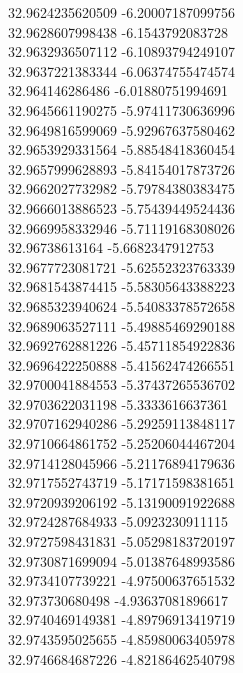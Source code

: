 {32.9624235620509	-6.20007187099756\\
32.9628607998438	-6.1543792083728\\
32.9632936507112	-6.10893794249107\\
32.9637221383344	-6.06374755474574\\
32.964146286486	-6.01880751994691\\
32.9645661190275	-5.97411730636996\\
32.9649816599069	-5.92967637580462\\
32.9653929331564	-5.88548418360454\\
32.9657999628893	-5.84154017873726\\
32.9662027732982	-5.79784380383475\\
32.9666013886523	-5.75439449524436\\
32.9669958332946	-5.71119168308026\\
32.96738613164	-5.6682347912753\\
32.9677723081721	-5.62552323763339\\
32.9681543874415	-5.58305643388223\\
32.9685323940624	-5.54083378572658\\
32.9689063527111	-5.49885469290188\\
32.9692762881226	-5.45711854922836\\
32.9696422250888	-5.41562474266551\\
32.9700041884553	-5.37437265536702\\
32.9703622031198	-5.3333616637361\\
32.9707162940286	-5.29259113848117\\
32.9710664861752	-5.25206044467204\\
32.9714128045966	-5.21176894179636\\
32.9717552743719	-5.17171598381651\\
32.9720939206192	-5.13190091922688\\
32.9724287684933	-5.0923230911115\\
32.9727598431831	-5.05298183720197\\
32.9730871699094	-5.01387648993586\\
32.9734107739221	-4.97500637651532\\
32.973730680498	-4.93637081896617\\
32.9740469149381	-4.89796913419719\\
32.9743595025655	-4.85980063405978\\
32.9746684687226	-4.82186462540798\\
}
